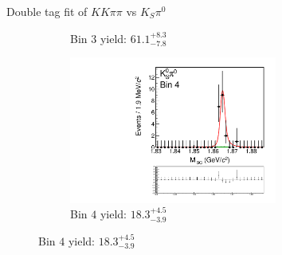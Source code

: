 \documentclass{beamer}
\begin{document}
\begin{frame}{Double tag fit of $KK\pi\pi$ vs $K_S\pi^0$}
\begin{figure}
\begin{subfigure}{0.5\textwidth}
      \caption{Bin $3$ yield: $61.1_{-7.8}^{+8.3}$}
    \end{subfigure}%
    \begin{subfigure}{0.5\textwidth}
      \centering
      \includegraphics[width=0.75\textwidth,trim={0 5cm 0 0},clip=true]{Plots/DoubleTagYield_DoubleTag_CP_KKpipi_vs_KSpi0_SignalBin4.pdf}
      \caption{Bin $4$ yield: $18.3_{-3.9}^{+4.5}$}
    \end{subfigure}
  \end{figure}
\end{frame}
\end{document}

